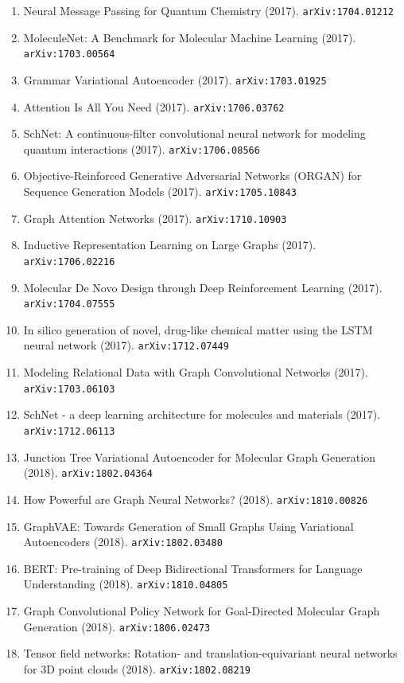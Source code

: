 \documentclass[11pt]{article}
\begin{document}
\begin{enumerate}
  \item Neural Message Passing for Quantum Chemistry (2017). \texttt{arXiv:1704.01212}
  \item MoleculeNet: A Benchmark for Molecular Machine Learning (2017). \texttt{arXiv:1703.00564}
  \item Grammar Variational Autoencoder (2017). \texttt{arXiv:1703.01925}
  \item Attention Is All You Need (2017). \texttt{arXiv:1706.03762}
  \item SchNet: A continuous-filter convolutional neural network for modeling
  quantum interactions (2017). \texttt{arXiv:1706.08566}
  \item Objective-Reinforced Generative Adversarial Networks (ORGAN) for
  Sequence Generation Models (2017). \texttt{arXiv:1705.10843}
  \item Graph Attention Networks (2017). \texttt{arXiv:1710.10903}
  \item Inductive Representation Learning on Large Graphs (2017). \texttt{arXiv:1706.02216}
  \item Molecular De Novo Design through Deep Reinforcement Learning (2017). \texttt{arXiv:1704.07555}
  \item In silico generation of novel, drug-like chemical matter using the LSTM
  neural network (2017). \texttt{arXiv:1712.07449}
  \item Modeling Relational Data with Graph Convolutional Networks (2017). \texttt{arXiv:1703.06103}
  \item SchNet - a deep learning architecture for molecules and materials (2017). \texttt{arXiv:1712.06113}
  \item Junction Tree Variational Autoencoder for Molecular Graph Generation (2018). \texttt{arXiv:1802.04364}
  \item How Powerful are Graph Neural Networks? (2018). \texttt{arXiv:1810.00826}
  \item GraphVAE: Towards Generation of Small Graphs Using Variational
  Autoencoders (2018). \texttt{arXiv:1802.03480}
  \item BERT: Pre-training of Deep Bidirectional Transformers for Language
  Understanding (2018). \texttt{arXiv:1810.04805}
  \item Graph Convolutional Policy Network for Goal-Directed Molecular Graph
  Generation (2018). \texttt{arXiv:1806.02473}
  \item Tensor field networks: Rotation- and translation-equivariant neural
  networks for 3D point clouds (2018). \texttt{arXiv:1802.08219}

\end{enumerate}
\end{document}
